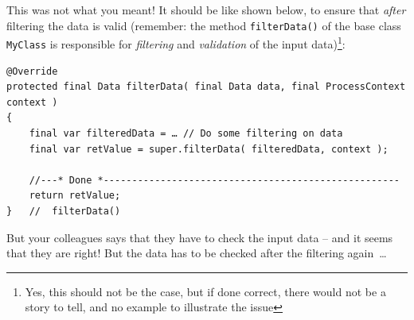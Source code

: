 This was not what you meant! It should be like shown below, to ensure that \textit{after} filtering the data is valid (remember: the method \lstinline|filterData()| of the base class \lstinline|MyClass| is responsible for \textit{filtering} and \textit{validation} of the input data)\footnote{Yes, this should not be the case, but if done correct, there would not be a story to tell, and no example to illustrate the issue}:
\begin{lstlisting}
@Override
protected final Data filterData( final Data data, final ProcessContext context )
{
    final var filteredData = … // Do some filtering on data
    final var retValue = super.filterData( filteredData, context );
        
    //---* Done *----------------------------------------------------
    return retValue;
}   //  filterData()
\end{lstlisting}

But your colleagues says that they have to check the input data – and it seems that they are right! But the data has to be checked after the filtering again~…

